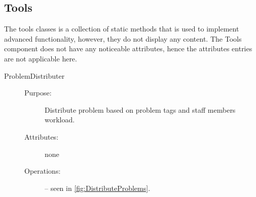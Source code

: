 \subsection{Tools}
The tools classes is a collection of static methods that is used to implement advanced functionality, however, they do not display any content.
The Tools component does not have any noticeable attributes, hence the attributes entries are not applicable here.

\begin{description}
\item[ProblemDistributer]\hfill
\begin{description}
\item[Purpose:]Distribute problem based on problem tags and staff members workload.
\item[Attributes:]none
\item[Operations:] -- seen in \ref{fig:DistributeProblems}.
\end{description}
\end{description}

